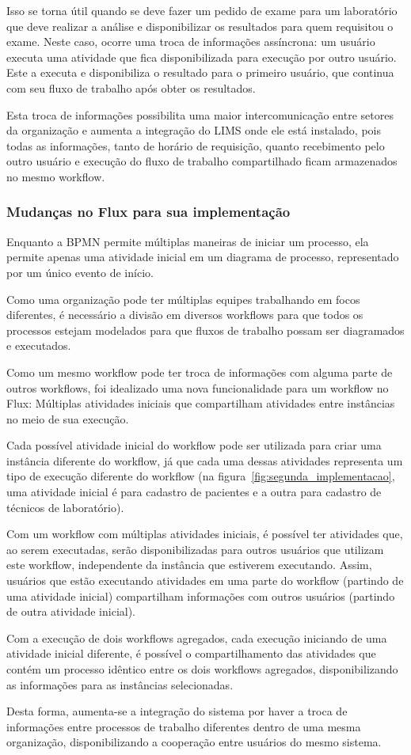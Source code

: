 Isso se torna útil quando se deve fazer um pedido de exame para um laboratório que deve realizar a análise e disponibilizar os resultados para quem requisitou o exame. Neste caso, ocorre uma troca de informações assíncrona: um usuário executa uma atividade que fica disponibilizada para execução por outro usuário. Este a executa e disponibiliza o resultado para o primeiro usuário, que continua com seu fluxo de trabalho após obter os resultados.

Esta troca de informações possibilita uma maior intercomunicação entre setores da organização e aumenta a integração do LIMS onde ele está instalado, pois todas as informações, tanto de horário de requisição, quanto recebimento pelo outro usuário e execução do fluxo de trabalho compartilhado ficam armazenados no mesmo workflow.

\subsubsection{Mudanças no Flux para sua implementação}

Enquanto a BPMN permite múltiplas maneiras de iniciar um processo, ela permite apenas uma atividade inicial em um diagrama de processo, representado por um único evento de início.

Como uma organização pode ter múltiplas equipes trabalhando em focos diferentes, é necessário a divisão em diversos workflows para que todos os processos estejam modelados para que fluxos de trabalho possam ser diagramados e executados.

Como um mesmo workflow pode ter troca de informações com alguma parte de outros workflows, foi idealizado uma nova funcionalidade para um workflow no Flux: Múltiplas atividades iniciais que compartilham atividades entre instâncias no meio de sua execução.

Cada possível atividade inicial do workflow pode ser utilizada para criar uma instância diferente do workflow, já que cada uma dessas atividades representa um tipo de execução diferente do workflow (na figura~\ref{fig:segunda_implementacao}, uma atividade inicial é para cadastro de pacientes e a outra para cadastro de técnicos de laboratório).

Com um workflow com múltiplas atividades iniciais, é possível ter atividades que, ao serem executadas, serão disponibilizadas para outros usuários que utilizam este workflow, independente da instância que estiverem executando. Assim, usuários que estão executando atividades em uma parte do workflow (partindo de uma atividade inicial) compartilham informações com outros usuários (partindo de outra atividade inicial).

Com a execução de dois workflows agregados, cada execução iniciando de uma atividade inicial diferente, é possível o compartilhamento das atividades que contém um processo idêntico entre os dois workflows agregados, disponibilizando as informações para as instâncias selecionadas.

Desta forma, aumenta-se a integração do sistema por haver a troca de informações entre processos de trabalho diferentes dentro de uma mesma organização, disponibilizando a cooperação entre usuários do mesmo sistema.